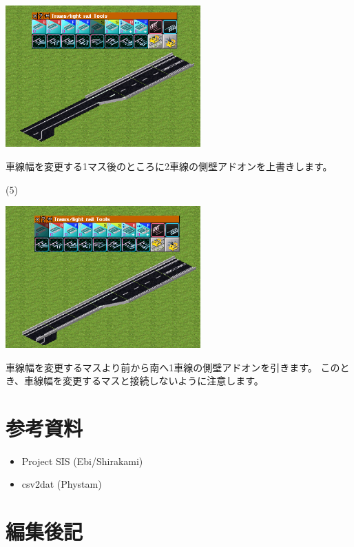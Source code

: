 \documentclass{jbook}
\begin{document}
\begin{multicols}{2}
\includegraphics[width = 75mm]{picture/20210214-road-5-4.png}

車線幅を変更する1マス後のところに2車線の側壁アドオンを上書きします。

\newpage

(5)

\includegraphics[width = 75mm]{picture/20210214-road-5-5.png}

車線幅を変更するマスより前から南へ1車線の側壁アドオンを引きます。
このとき、車線幅を変更するマスと接続しないように注意します。


\end{multicols}

\newpage

\section{参考資料}
\begin{itemize}
  \item Project SIS (Ebi/Shirakami)
  \item csv2dat (Phystam)
\end{itemize}

\section{編集後記}
\end{document}
